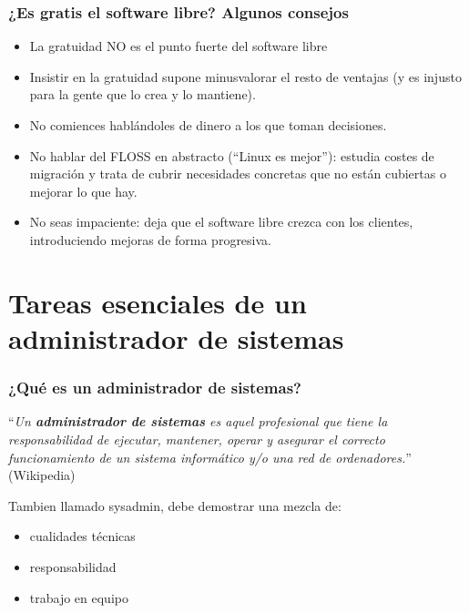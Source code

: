 \documentclass{beamer}
\begin{document}

\begin{frame}
\frametitle{¿Es gratis el software libre? Algunos consejos}

\pause

\begin{itemize}
\item La gratuidad NO es el punto fuerte del software libre
\item Insistir en la gratuidad supone minusvalorar el resto de ventajas (y es injusto para la gente que lo crea y lo mantiene).
\item No comiences hablándoles de dinero a los que toman decisiones.
\item No hablar del FLOSS en abstracto (``Linux es mejor''): estudia costes de migración y trata de cubrir necesidades concretas que no están cubiertas o mejorar lo que hay.
\item No seas impaciente: deja que el software libre crezca con los clientes, introduciendo mejoras de forma progresiva.
\end{itemize}
\end{frame}


\section{Tareas esenciales de un administrador de sistemas}

\begin{frame}
\frametitle{¿Qué es un administrador de sistemas?}

\vspace{-1cm}

\begin{block}{}
``\textit{Un \textbf{administrador de sistemas} es aquel profesional que tiene la responsabilidad de ejecutar, mantener, operar y asegurar el correcto funcionamiento de un sistema informático y/o una red de ordenadores.}'' (Wikipedia)
\end{block}

\medskip

Tambien llamado \alert{sysadmin}, debe demostrar una mezcla de:

\begin{itemize}
\item \alert{cualidades técnicas} 
\item \alert{responsabilidad} 
\item \alert{trabajo en equipo}
\end{itemize}

\end{frame}
\end{document}
